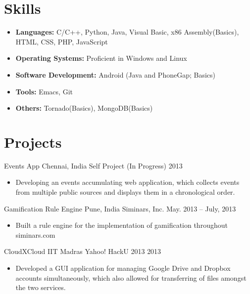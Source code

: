 \documentclass[letterpaper,11pt]{resume}
\begin{document}
\section{Skills}
\begin{itemize}
  \item {\bf Languages:} C/C++, Python, Java, Visual Basic, x86 Assembly(Basics), HTML, CSS, PHP, JavaScript	
  \item {\bf Operating Systems:} Proficient in Windows and Linux
  \item {\bf Software Development:} Android (Java and PhoneGap; Basics)
  \item {\bf Tools:} Emacs, Git
  \item {\bf Others:} Tornado(Basics), MongoDB(Basics)
  \end{itemize} %
\section{Projects}
\begin{itemize}
   \credential
    {{Events App}}
    {Chennai, India}
    {Self Project (In Progress)}
    {2013}
    {
     \begin{itemize}
      \item Developing an events accumulating web application, which collects events from multiple public sources and displays them in a chronological order.
     \end{itemize}

    }
    
   \bigskip 

   
   \credential
    {{Gamification Rule Engine}}
    {Pune, India}
    {{Siminars, Inc.}}
    {May. 2013 -- July, 2013}
 { \begin{itemize}
      \item{Built a rule engine for the implementation of gamification throughout siminars.com}
      \end{itemize}
    }
    \bigskip
   \credential
    {{CloudXCloud}}
    {IIT Madras}
    {{Yahoo! HackU 2013}}
    {2013} 
    {\begin{itemize}
     \item Developed a GUI application for managing Google Drive and Dropbox accounts simultaneously, which also allowed for transferring of files amongst the two services.
    \end{itemize}
}
   \bigskip
   
\end{itemize}
\end{document}
